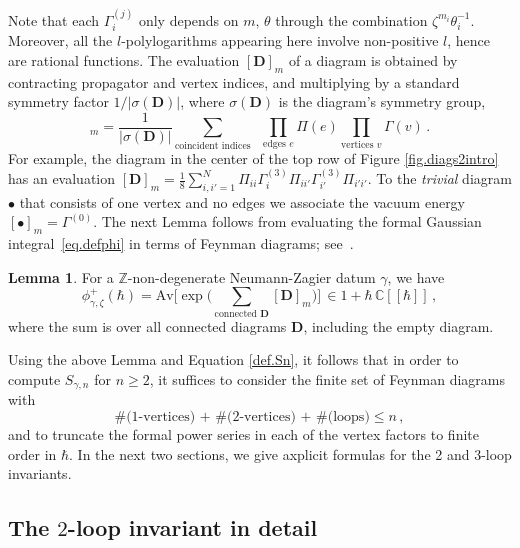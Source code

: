 \documentclass[12pt]{amsart}
\theoremstyle{definition}
\newtheorem{lemma}[theorem]{Lemma}
\def\BZ{\mathbb Z}
\def\BC{\mathbb C}
\def\be{  \begin{equation} }
\def\ee{  \end{equation} }
\def\Av{\mathrm{Av}}
\newcommand{\mb}{\mathbf}
\begin{document}
Note that each $\Gamma_i^{(j)}$ only depends on $m,\,\theta$ through the 
combination $\zeta^{m_i}\theta_i^{-1}$. Moreover, all the $l$-polylogarithms 
appearing here involve non-positive $l$, hence are rational functions. 
The evaluation $[\mb D]_m$ of a diagram is obtained by contracting 
propagator and vertex indices, and multiplying by a standard symmetry 
factor $1/|\sigma(\mb D)|$, where $\sigma(\mb D)$ is the diagram's symmetry 
group,
%
\be [\mb D]_m =  \frac{1}{|\sigma(\mb D)|} 
\sum_{\text{coincident indices}} \;\;\prod_{\text{edges $e$}} 
\Pi(e)\prod_{\text{vertices $v$}}  \Gamma(v)\,. \ee
%
For example, the diagram in the center of the top row of Figure 
\ref{fig.diags2intro} has an evaluation $[\mb D]_m = 
\frac18 \sum_{i,i'=1}^N \Pi_{ii}\Gamma^{(3)}_i \Pi_{ii'}\Gamma^{(3)}_{i'}\Pi_{i'i'}$. 
To the \emph{trivial} diagram $\bullet$ that consists of one vertex and
no edges we associate the vacuum energy 
$[\bullet]_m=\Gamma^{(0)}$. The next Lemma follows from evaluating the 
formal Gaussian integral~\eqref{eq.defphi} in terms of Feynman diagrams;
see~\cite{BIZ}.

\begin{lemma}
\label{lem.phih}
For a $\BZ$-non-degenerate Neumann-Zagier datum $\gamma$, we have
%
\be 
\phi^+_{\gamma,\zeta}(\hbar)  = %
\Av \bigg[ \exp\bigg( \sum_{\text{connected $\mb D$}} [\mb D]_m\bigg)\bigg]\, 
\in 1 + \hbar\,\BC[\![\hbar]\!]\,, 
\ee
%
where the sum is over all connected diagrams $\mb D$, including the empty 
diagram. 
\end{lemma}
Using the above Lemma and Equation \eqref{def.Sn}, it follows 
that in order to compute $S_{\gamma,n}$ for $n\geq 2$, it 
suffices to consider the finite set of Feynman diagrams with
%
\be 
\label{eq.LD}
\text{\#(1-vertices) + \#(2-vertices) + \#(loops)} \leq n \,,
\ee
%
and to truncate the formal power series in each of the vertex factors to 
finite order in $\hbar$. In the next two sections, we give axplicit
formulas for the 2 and 3-loop invariants.

\subsection{The $2$-loop invariant in detail}
\label{sub.2loop}
\end{document}

